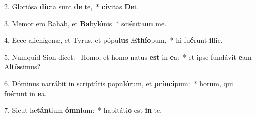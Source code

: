 2. Gloriósa \textbf{dic}ta sunt \textbf{de} te,~*  \textbf{cí}vitas \textbf{De}i.\

3. Memor ero Rahab, et \textbf{Ba}by\textbf{ló}nis~*  sci\textbf{én}ti\textbf{um} me.\

4. Ecce alienígenæ, et Tyrus, et pópu\textbf{lus} Æ\textbf{thí}\textbf{o}pum,~*  hi fu\textbf{é}runt \textbf{il}lic.\

5. Numquid Sion dicet: \dag\  Homo, et homo natus \textbf{est} in \textbf{e}a:~*  et ipse fundávit \textbf{e}am Al\textbf{tís}simus?\

6. Dóminus narrábit in scriptúris popu\textbf{ló}rum, et \textbf{prín}\textbf{ci}pum:~*  horum, qui fu\textbf{é}runt in \textbf{e}a.\

7. Sicut læ\textbf{tán}tium \textbf{óm}\textbf{ni}um:~*  habitáti\textbf{o} est \textbf{in} te.\

